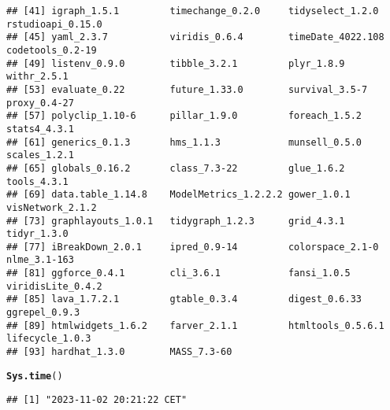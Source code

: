 \documentclass{article}\usepackage[]{graphicx}\usepackage[]{xcolor}
\makeatletter
\newcommand{\hlstd}[1]{\textcolor[rgb]{0.345,0.345,0.345}{#1}}%
\newcommand{\hlkwd}[1]{\textcolor[rgb]{0.737,0.353,0.396}{\textbf{#1}}}%
\newenvironment{kframe}{%
 \def\at@end@of@kframe{}%
 \ifinner\ifhmode%
  \def\at@end@of@kframe{\end{minipage}}%
  \begin{minipage}{\columnwidth}%
 \fi\fi%
 \def\FrameCommand##1{\hskip\@totalleftmargin \hskip-\fboxsep
 \colorbox{shadecolor}{##1}\hskip-\fboxsep
     \hskip-\linewidth \hskip-\@totalleftmargin \hskip\columnwidth}%
 \MakeFramed {\advance\hsize-\width
   \@totalleftmargin\z@ \linewidth\hsize
   \@setminipage}}%
 {\par\unskip\endMakeFramed%
 \at@end@of@kframe}
\newenvironment{knitrout}{}{} %
\makeatother
\begin{document}
\begin{knitrout}
\begin{kframe}
\begin{verbatim}
## [41] igraph_1.5.1         timechange_0.2.0     tidyselect_1.2.0     rstudioapi_0.15.0   
## [45] yaml_2.3.7           viridis_0.6.4        timeDate_4022.108    codetools_0.2-19    
## [49] listenv_0.9.0        tibble_3.2.1         plyr_1.8.9           withr_2.5.1         
## [53] evaluate_0.22        future_1.33.0        survival_3.5-7       proxy_0.4-27        
## [57] polyclip_1.10-6      pillar_1.9.0         foreach_1.5.2        stats4_4.3.1        
## [61] generics_0.1.3       hms_1.1.3            munsell_0.5.0        scales_1.2.1        
## [65] globals_0.16.2       class_7.3-22         glue_1.6.2           tools_4.3.1         
## [69] data.table_1.14.8    ModelMetrics_1.2.2.2 gower_1.0.1          visNetwork_2.1.2    
## [73] graphlayouts_1.0.1   tidygraph_1.2.3      grid_4.3.1           tidyr_1.3.0         
## [77] iBreakDown_2.0.1     ipred_0.9-14         colorspace_2.1-0     nlme_3.1-163        
## [81] ggforce_0.4.1        cli_3.6.1            fansi_1.0.5          viridisLite_0.4.2   
## [85] lava_1.7.2.1         gtable_0.3.4         digest_0.6.33        ggrepel_0.9.3       
## [89] htmlwidgets_1.6.2    farver_2.1.1         htmltools_0.5.6.1    lifecycle_1.0.3     
## [93] hardhat_1.3.0        MASS_7.3-60
\end{verbatim}
\begin{alltt}
\hlkwd{Sys.time}\hlstd{()}
\end{alltt}
\begin{verbatim}
## [1] "2023-11-02 20:21:22 CET"
\end{verbatim}
\end{kframe}
\end{knitrout}
\end{document}
